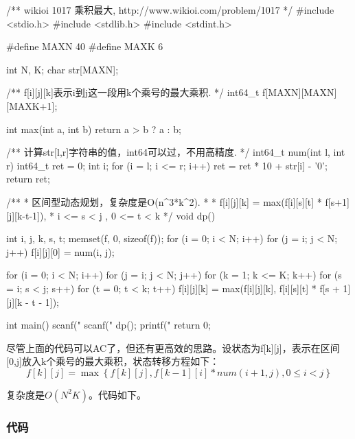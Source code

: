 \begin{Code}
/** wikioi 1017 乘积最大, http://www.wikioi.com/problem/1017 */
#include <stdio.h>
#include <stdlib.h>
#include <stdint.h>

#define MAXN 40
#define MAXK 6

int N, K;
char str[MAXN];

/** f[i][j][k]表示i到j这一段用k个乘号的最大乘积. */
int64_t f[MAXN][MAXN][MAXK+1];


int max(int a, int b) {
    return a > b ? a : b;
}

/** 计算str[l,r]字符串的值，int64可以过，不用高精度. */
int64_t num(int l, int r) {
    int64_t ret = 0;
    int i;
    for (i = l; i <= r; i++) {
        ret = ret * 10 + str[i] - '0';
    }
    return ret;
}

/**
 * 区间型动态规划，复杂度是O(n^3*k^2).
 *
 * f[i][j][k] = max(f[i][s][t] * f[s+1][j][k-t-1]),
 * i <= s < j , 0 <= t < k
 */
void dp() {
    int i, j, k, s, t;
    memset(f, 0, sizeof(f));
    for (i = 0; i < N; i++) {
        for (j = i; j < N; j++) {
            f[i][j][0] = num(i, j);
        }
    }

    for (i = 0; i < N; i++) {
        for (j = i; j < N; j++) {
            for (k = 1; k <= K; k++) {
                for (s = i; s < j; s++) {
                    for (t = 0; t < k; t++) {
                        f[i][j][k] = max(f[i][j][k],
                                f[i][s][t] * f[s + 1][j][k - t - 1]);
                    }
                }
            }
        }
    }
}

int main() {
    scanf("%
    scanf("%
    dp();
    printf("%
    return 0;
}
\end{Code}

尽管上面的代码可以AC了，但还有更高效的思路。设状态为f[k][j]，表示在区间[0,j]放入k个乘号的最大乘积，状态转移方程如下：
$$
f[k][j]=\max\left\{f[k][j], f[k-1][i]*num(i+1,j), 0 \leq i < j\right\}
$$

复杂度是$O(N^2K)$。代码如下。

\subsubsection{代码}

